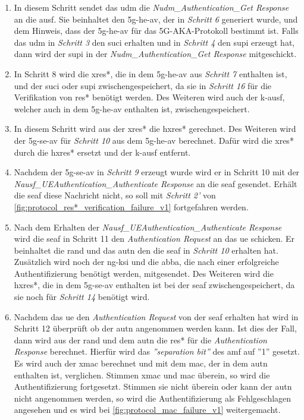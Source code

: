 \begin{enumerate}
\item In diesem Schritt sendet das \gls{udm} die \textit{Nudm\_Authentication\_Get Response} an die \gls{ausf}.
Sie beinhaltet den \gls{5g-he-av}, der in \textit{Schritt 6} generiert wurde, und dem Hinweis, dass der \gls{5g-he-av} f\"ur das 5G-AKA-Protokoll bestimmt ist.
Falls das \gls{udm} in \textit{Schritt 3} den \gls{suci} erhalten und in \textit{Schritt 4} den \gls{supi} erzeugt hat, dann wird der \gls{supi} in der \textit{Nudm\_Authentication\_Get Response} mitgeschickt.

\item In Schritt 8 wird die \gls{xres*}, die in dem \gls{5g-he-av} aus \textit{Schritt 7} enthalten ist, und der \gls{suci} oder \gls{supi} zwischengespeichert, da sie in \textit{Schritt 16} f\"ur die Verifikation von \gls{res*} ben\"otigt werden.
Des Weiteren wird auch der \gls{k-ausf}, welcher auch in dem \gls{5g-he-av} enthalten ist, zwischengespeichert.

\item In diesem Schritt wird aus der \gls{xres*} die \gls{hxres*} gerechnet.
Des Weiteren wird der \gls{5g-se-av} f\"ur \textit{Schritt 10} aus dem \gls{5g-he-av} berechnet.
Daf\"ur wird die \gls{xres*} durch die \gls{hxres*} ersetzt und der \gls{k-ausf} entfernt.

\item Nachdem der \gls{5g-se-av} in \textit{Schritt 9} erzeugt wurde wird er in Schritt 10 mit der \textit{Nausf\_UEAuthentication\_Authenticate Response} an die \gls{seaf} gesendet.
Erh\"alt die \gls{seaf} diese Nachricht nicht, so soll mit \textit{Schritt 2'} von \cref{fig:protocol_res*_verification_failure_v1} fortgefahren werden.

\item Nach dem Erhalten der \textit{Nausf\_UEAuthentication\_Authenticate Response} wird die \gls{seaf} in Schritt 11 den \textit{Authentication Request}  an das \gls{ue} schicken.
Er beinhaltet die \gls{rand} und das \gls{autn} den die \gls{seaf} in \textit{Schritt 10} erhalten hat.
Zus\"atzlich wird noch der \gls{ng-ksi} und die \gls{abba}, die nach einer erfolgreiche Authentifizierung ben\"otigt werden, mitgesendet.
Des Weiteren wird die \gls{hxres*}, die in dem \gls{5g-se-av} enthalten ist bei der \gls{seaf} zwischengespeichert, da sie noch f\"ur \textit{Schritt 14} ben\"otigt wird.

\item Nachdem das \gls{ue} den \textit{Authentication Request} von der \gls{seaf} erhalten hat wird in Schritt 12 \"uberpr\"uft ob der \gls{autn} angenommen werden kann.
Ist dies der Fall, dann wird aus der \gls{rand} und dem \gls{autn} die \gls{res*} f\"ur die \textit{Authentication Response} berechnet.
Hierf\"ur wird das \textit{''separation bit''} des \gls{amf} auf ''1'' gesetzt.
Es wird auch der \gls{xmac} berechnet und mit dem \gls{mac}, der in dem \gls{autn} enthalten ist, verglichen.
Stimmen \gls{xmac} und \gls{mac} \"uberein, so wird die Authentifizierung fortgesetzt.
Stimmen sie nicht \"uberein oder kann der \gls{autn} nicht angenommen werden, so wird die Authentifizierung als Fehlgeschlagen angesehen und es wird bei \cref{fig:protocol_mac_failure_v1} weitergemacht.


\end{enumerate}
